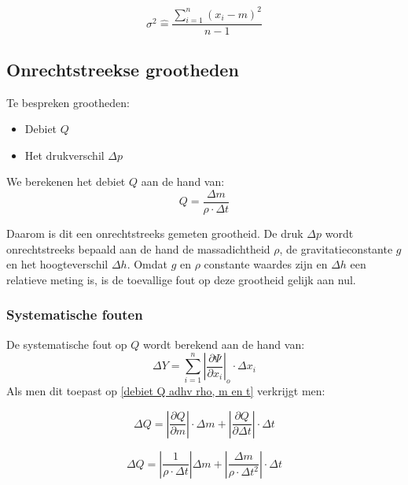 \begin{equation}
    \sigma^{2} \hat{=} \frac{\sum\limits_{i=1}^n (x_i - m)^2}{n - 1}
\end{equation}



\subsection{Onrechtstreekse grootheden}

Te bespreken grootheden:
\begin{itemize}
    \item Debiet $Q$
    \item Het drukverschil $\Delta p$
\end{itemize}

We berekenen het debiet $Q$ aan de hand van: 
\begin{equation}
\label{debiet Q adhv rho, m en t}
    Q = \frac{\Delta m}{\rho \cdot \Delta t}
\end{equation}

Daarom is dit een onrechtstreeks gemeten grootheid.
De druk $\Delta p$ wordt onrechtstreeks bepaald aan de hand de massadichtheid $\rho$, de gravitatieconstante $g$ en het hoogteverschil $\Delta h$. Omdat $g$ en $\rho$ constante waardes zijn en $\Delta h$ een relatieve meting is, is de toevallige fout op deze grootheid gelijk aan nul.


\subsubsection{Systematische fouten}
De systematische fout op $Q$ wordt berekend aan de hand van:
\begin{equation}
    \Delta Y = \sum\limits_{i=1}^n \left|\frac{\partial \Psi}{\partial x_i}\right|_o \cdot \Delta x_i 
\end{equation}
Als men dit toepast op \eqref{debiet Q adhv rho, m en t} verkrijgt men:

\begin{equation*}
    \Delta Q = \left|\frac{\partial Q}{\partial m}\right|\cdot \Delta m + \left| \frac{\partial Q}{\partial \Delta t}\right| \cdot \Delta t
\end{equation*}

\begin{equation*}
    \Delta Q = \left|\frac{1}{\rho \cdot \Delta t}\right|\Delta m + \left|\frac{\Delta m}{\rho \cdot \Delta t^{2}}\right|\cdot \Delta t
\end{equation*}


